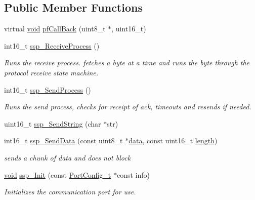 \subsection*{Public Member Functions}
\begin{DoxyCompactItemize}
\item 
virtual \hyperlink{group___u_a_v_objects_plugin_ga444cf2ff3f0ecbe028adce838d373f5c}{void} \hyperlink{classqssp_ga28dc454e607c69686bf4df989ad3d1ae}{pf\-Call\-Back} (uint8\-\_\-t $\ast$, uint16\-\_\-t)
\item 
int16\-\_\-t \hyperlink{classqssp_ga11e7402dcc0d8efde83d13592279f122}{ssp\-\_\-\-Receive\-Process} ()
\begin{DoxyCompactList}\small\item\em Runs the receive process. fetches a byte at a time and runs the byte through the protocol receive state machine. \end{DoxyCompactList}\item 
int16\-\_\-t \hyperlink{classqssp_gaa1b44e385ddf057c81585809dc71e4ba}{ssp\-\_\-\-Send\-Process} ()
\begin{DoxyCompactList}\small\item\em Runs the send process, checks for receipt of ack, timeouts and resends if needed. \end{DoxyCompactList}\item 
uint16\-\_\-t \hyperlink{classqssp_a53a085c64c9a0e54a10cefe2ce660714}{ssp\-\_\-\-Send\-String} (char $\ast$str)
\item 
int16\-\_\-t \hyperlink{classqssp_gae129d1cdf9ba386b6cd8002176a35a3b}{ssp\-\_\-\-Send\-Data} (const uint8\-\_\-t $\ast$\hyperlink{glext_8h_a8850df0785e6fbcc2351af3b686b8c7a}{data}, const uint16\-\_\-t \hyperlink{glext_8h_a3c8469415bbc83dd1341af15c67f1cef}{length})
\begin{DoxyCompactList}\small\item\em sends a chunk of data and does not block \end{DoxyCompactList}\item 
\hyperlink{group___u_a_v_objects_plugin_ga444cf2ff3f0ecbe028adce838d373f5c}{void} \hyperlink{classqssp_gaa7efad31d36502cca3aab3e4eed10d12}{ssp\-\_\-\-Init} (const \hyperlink{struct_port_config__t}{Port\-Config\-\_\-t} $\ast$const info)
\begin{DoxyCompactList}\small\item\em Initializes the communication port for use. \end{DoxyCompactList}\item 

\end{DoxyCompactItemize}
